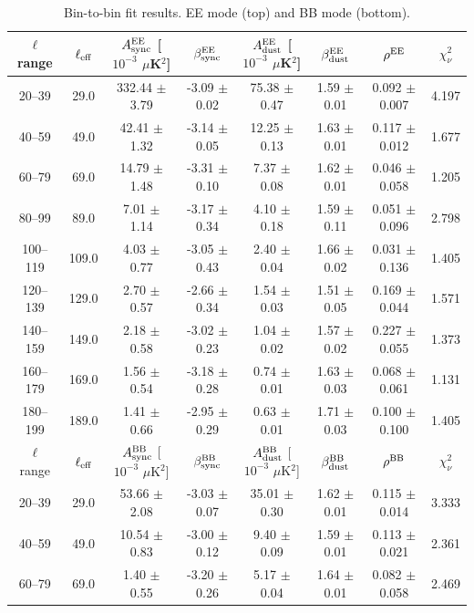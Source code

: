 \begin{table}[htbp]
\centering
\caption{Bin-to-bin fit results. EE mode (top) and BB mode (bottom).}
\label{tab:bin_to_bin_results}
\begin{tabular}{c c c c c c c c}
\hline\hline
$\ell$ range & $\ell_{\rm eff}$ & $A^{\rm EE}_{\rm sync}$ [$10^{-3}$ $\mu$K$^2$] & $\beta^{\rm EE}_{\rm sync}$ & $A^{\rm EE}_{\rm dust}$ [$10^{-3}$ $\mu$K$^2$] & $\beta^{\rm EE}_{\rm dust}$ & $\rho^{\rm EE}$ & $\chi^2_\nu$ \\
\hline
20--39 & 29.0 & 332.44 $\pm$ 3.79 & -3.09 $\pm$ 0.02 & 75.38 $\pm$ 0.47 & 1.59 $\pm$ 0.01 & 0.092 $\pm$ 0.007 & 4.197 \\
40--59 & 49.0 & 42.41 $\pm$ 1.32 & -3.14 $\pm$ 0.05 & 12.25 $\pm$ 0.13 & 1.63 $\pm$ 0.01 & 0.117 $\pm$ 0.012 & 1.677 \\
60--79 & 69.0 & 14.79 $\pm$ 1.48 & -3.31 $\pm$ 0.10 & 7.37 $\pm$ 0.08 & 1.62 $\pm$ 0.01 & 0.046 $\pm$ 0.058 & 1.205 \\
80--99 & 89.0 & 7.01 $\pm$ 1.14 & -3.17 $\pm$ 0.34 & 4.10 $\pm$ 0.18 & 1.59 $\pm$ 0.11 & 0.051 $\pm$ 0.096 & 2.798 \\
100--119 & 109.0 & 4.03 $\pm$ 0.77 & -3.05 $\pm$ 0.43 & 2.40 $\pm$ 0.04 & 1.66 $\pm$ 0.02 & 0.031 $\pm$ 0.136 & 1.405 \\
120--139 & 129.0 & 2.70 $\pm$ 0.57 & -2.66 $\pm$ 0.34 & 1.54 $\pm$ 0.03 & 1.51 $\pm$ 0.05 & 0.169 $\pm$ 0.044 & 1.571 \\
140--159 & 149.0 & 2.18 $\pm$ 0.58 & -3.02 $\pm$ 0.23 & 1.04 $\pm$ 0.02 & 1.57 $\pm$ 0.02 & 0.227 $\pm$ 0.055 & 1.373 \\
160--179 & 169.0 & 1.56 $\pm$ 0.54 & -3.18 $\pm$ 0.28 & 0.74 $\pm$ 0.01 & 1.63 $\pm$ 0.03 & 0.068 $\pm$ 0.061 & 1.131 \\
180--199 & 189.0 & 1.41 $\pm$ 0.66 & -2.95 $\pm$ 0.29 & 0.63 $\pm$ 0.01 & 1.71 $\pm$ 0.03 & 0.100 $\pm$ 0.100 & 1.405 \\
\hline
$\ell$ range & $\ell_{\rm eff}$ & $A^{\rm BB}_{\rm sync}$ [$10^{-3}$ $\mu$K$^2$] & $\beta^{\rm BB}_{\rm sync}$ & $A^{\rm BB}_{\rm dust}$ [$10^{-3}$ $\mu$K$^2$] & $\beta^{\rm BB}_{\rm dust}$ & $\rho^{\rm BB}$ & $\chi^2_\nu$ \\
\hline
20--39 & 29.0 & 53.66 $\pm$ 2.08 & -3.03 $\pm$ 0.07 & 35.01 $\pm$ 0.30 & 1.62 $\pm$ 0.01 & 0.115 $\pm$ 0.014 & 3.333 \\
40--59 & 49.0 & 10.54 $\pm$ 0.83 & -3.00 $\pm$ 0.12 & 9.40 $\pm$ 0.09 & 1.59 $\pm$ 0.01 & 0.113 $\pm$ 0.021 & 2.361 \\
60--79 & 69.0 & 1.40 $\pm$ 0.55 & -3.20 $\pm$ 0.26 & 5.17 $\pm$ 0.04 & 1.64 $\pm$ 0.01 & 0.082 $\pm$ 0.058 & 2.469 \\

\end{tabular}
\end{table}
